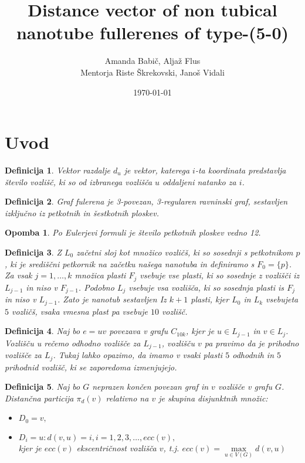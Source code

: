 \documentclass[a4paper, 12pt]{article}
\title{
    Distance vector of non tubical nanotube fullerenes of type-(5-0)
}
\author{Amanda Babič, Aljaž Flus \\
        {\small Mentorja Riste Škrekovski, Janoš Vidali}}
\date{\today}
\newtheorem{definicija}{Definicija}[section]
\newtheorem{opomba}{Opomba}[section]
\begin{document}
\maketitle

\newpage

\section{Uvod}

\begin{definicija}
    Vektor razdalje $d_{u}$ je vektor, katerega $i$-ta koordinata predstavlja število vozlišč, ki so od izbranega vozlišča $u$ oddaljeni natanko za $i$. 
\end{definicija}

\begin{definicija}
    Graf fulerena je 3-povezan, 3-regularen ravninski graf, sestavljen izključno iz petkotnih in šestkotnih ploskev.
\end{definicija}

\begin{opomba}
    Po Eulerjevi formuli je število petkotnih ploskev vedno 12.
\end{opomba}

\begin{definicija}
    Z $L_{0}$ začetni sloj kot množico vozličš, ki so sosednji s petkotnikom $p$, ki je središčni petkornik na začetku našega nanotuba 
    in definiramo s $F_0 = \{p\}$. Za vsak $j = 1, \dots , k$ množica plasti $F_j$ vsebuje vse plasti, ki so sosednje z vozlišči iz $L_{j-1}$ 
    in niso v $F_{j-1}$. Podobno $L_j$ vsebuje vsa vozlišča, ki so sosednja plasti is $F_j$ in niso v $L_{j-1}$. Zato je nanotub sestavljen Iz 
    $k+1$ plasti, kjer $L_0$ in $L_{k}$ vsebujeta $5$ vozličš, vsaka vmesna plast pa vsebuje $10$ vozlišč.
\end{definicija}

\begin{definicija}
    Naj bo $e = uv$ povezava v grafu $C_{10k}$, kjer je $u \in L_{j-1}$ in $v \in L_j$. Vozlišču u rečemo odhodno vozlišče za $L_{j-1}$, 
    vozlišču $v$ pa pravimo da je prihodno vozlišče za $L_j$. Tukaj lahko opazimo, da imamo v vsaki plasti $5$ odhodnih in $5$ prihodnid vozlišč,
    ki se zaporedoma izmenjujejo.
\end{definicija}

\begin{definicija}
    Naj bo $G$ neprazen končen povezan graf in $v$ vozlišče v grafu $G$. Distančna particija $\pi_{d}(v)$ 
    relativno na $v$ je skupina disjunktnih množic:
    \begin{itemize}
        \item $D_{0} = {v},$
        \item $D_{i} = {u : d(v,u) = i}, i= 1,2,3, \dots , ecc(v),$ \\
        kjer je $ecc(v)$ ekscentričnost vozlišča $v$, t.j. $ecc(v) = \max\limits_{u \in V(G)} d(v,u)$

    \end{itemize}
\end{definicija}
\end{document}
